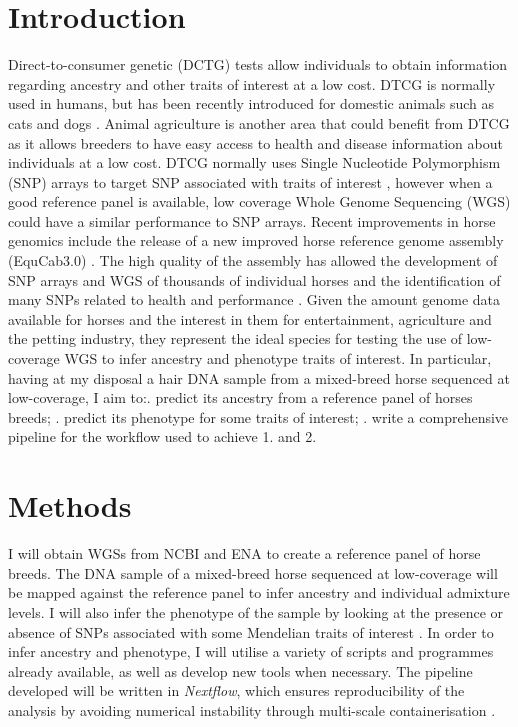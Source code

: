 \documentclass[a4paper,11]{article}
\begin{document}
\section{Introduction}
    Direct-to-consumer genetic (DCTG) tests allow individuals to obtain information regarding ancestry and other traits of interest at a low cost. DTCG is normally used in humans, but has been recently introduced for domestic animals such as cats and dogs \citep{DTCcats, DTCdogs}. Animal agriculture is another area that could benefit from DTCG as it allows breeders to have easy access to health and disease information about individuals at a low cost. DTCG normally uses Single Nucleotide Polymorphism (SNP) arrays to target SNP associated with traits of interest \citep{khan2018consumer}, however when a good reference panel is available, low coverage Whole Genome Sequencing (WGS) could have a similar performance to SNP arrays. 
    Recent improvements in horse genomics include the release of a new improved horse reference genome assembly (EquCab3.0) \citep{horserefgenome, Equ-Cab3.0}. The high quality of the assembly has allowed the development of SNP arrays and WGS of thousands of individual horses and the identification of many SNPs related to health and performance \citep{horserefgenome}.
    Given the amount genome data available for horses and the interest in them for entertainment, agriculture and the petting industry, they represent the ideal species for testing the use of low-coverage WGS to infer ancestry and phenotype traits of interest. In particular, having at my disposal a hair DNA sample from a mixed-breed horse sequenced at low-coverage, I aim to:. predict its ancestry from a reference panel of horses breeds; . predict its phenotype for some traits of interest; . write a comprehensive pipeline for the workflow used to achieve 1. and 2.

\section{Methods}
    I will obtain WGSs from NCBI and ENA to create a reference panel of horse breeds. The DNA sample of a mixed-breed horse sequenced at low-coverage will be mapped against the reference panel to infer ancestry and individual admixture levels. I will also infer the phenotype of the sample by looking at the presence or absence of SNPs associated with some Mendelian traits of interest \citep{horserefgenome}. In order to infer ancestry and phenotype, I will utilise a variety of scripts and programmes already available, as well as develop new tools when necessary. 
    The pipeline developed will be written in \textit{Nextflow}, which ensures reproducibility of the analysis by avoiding numerical instability through multi-scale containerisation \citep{nextflow}.
\end{document}
